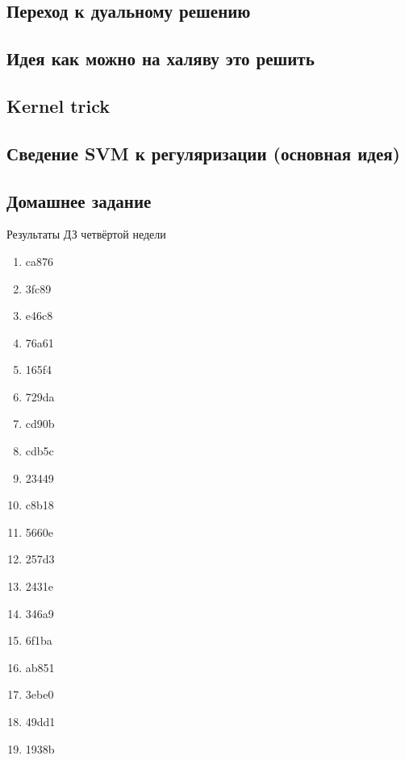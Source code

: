 \documentclass[14pt, fleqn, xcolor={dvipsnames, table}]{beamer}
\begin{document}
\subsection{Переход к дуальному решению}
\subsection{Идея как можно на халяву это решить}
\subsection{Kernel trick}
\subsection{Сведение SVM к регуляризации (основная идея)}
\subsection{Домашнее задание}
\begin{frame}{Результаты ДЗ четвёртой недели}
\tiny
\begin{center}
\begin{enumerate}
\item ca876
\item 3fc89
\item e46c8
\item 76a61
\item 165f4
\item 729da
\item cd90b
\item cdb5c
\item 23449
\item c8b18
\item 5660e
\item 257d3
\item 2431e
\item 346a9
\item 6f1ba
\item ab851
\item 3ebe0
\item 49dd1
\item 1938b
\end{enumerate}
\end{center}
\end{frame}
\end{document}
